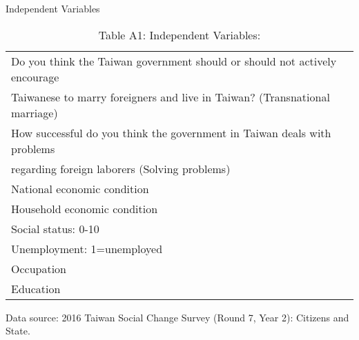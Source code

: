 \documentclass[12pt]{beamer}
\begin{document}
\begin{frame}{Independent Variables}
\begin{table}[ht!]
\footnotesize
\scripsize
\begin{center}
  \begin{threeparttable}
\caption*{Table A1: Independent Variables: }
\begin{tabular}{l} 
\toprule
\midrule
Do you think the Taiwan government should or should not actively encourage   \\
\qquad Taiwanese to marry foreigners and live in Taiwan? (Transnational marriage)   \\
How successful do you think the government in Taiwan deals with problems   \\
\qquad  regarding foreign laborers (Solving problems) \\
National economic condition \\
Household economic condition \\
Social status: 0-10\\
Unemployment: 1=unemployed \\
Occupation\\
Education \\
\bottomrule
\end{tabular}
\begin{tablenotes}
  \item \footnotesize{Data source: 2016 Taiwan Social Change Survey (Round 7, Year 2): Citizens and State.}
\end{tablenotes}
  \end{threeparttable}
\end{center}
\end{table} 
\end{frame}
\end{document}
